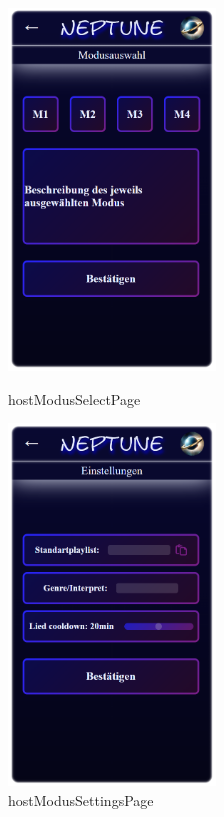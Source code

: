\documentclass[oneside, ngerman]{sdqtechreport}
\begin{document}
\begin{figure}
   \begin{minipage}[b]{.4\linewidth} %
      \includegraphics[width=5.5cm]{LATEX/Pflichtenheft/GraphicDesigns/hostModusSelectPage.png}
      \caption{hostModusSelectPage}
   \end{minipage}
   \hspace{2cm}%
   \begin{minipage}[b]{.4\linewidth} %
      \includegraphics[width=5.5cm]{LATEX/Pflichtenheft/GraphicDesigns/hostModusSettingsPage.png}
      \caption{hostModusSettingsPage}
   \end{minipage}
   

\end{figure}
\end{document}
